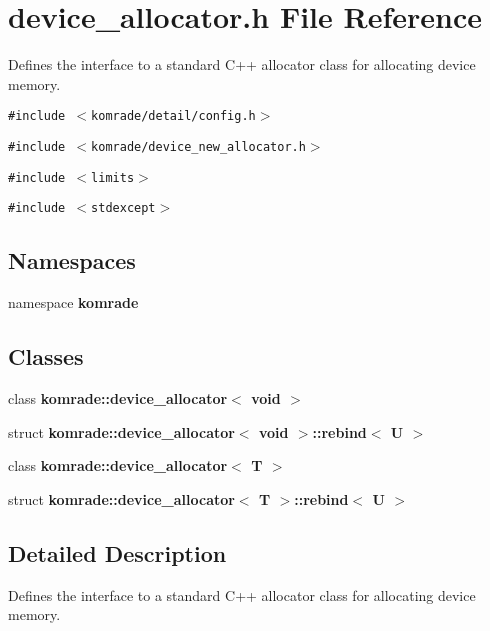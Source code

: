 \section{device\_\-allocator.h File Reference}
\label{device__allocator_8h}
Defines the interface to a standard C++ allocator class for allocating device memory. 

{\tt \#include $<$komrade/detail/config.h$>$}\par
{\tt \#include $<$komrade/device\_\-new\_\-allocator.h$>$}\par
{\tt \#include $<$limits$>$}\par
{\tt \#include $<$stdexcept$>$}\par
\subsection*{Namespaces}
\begin{CompactItemize}
\item 
namespace {\bf komrade}
\end{CompactItemize}
\subsection*{Classes}
\begin{CompactItemize}
\item 
class {\bf komrade::device\_\-allocator$<$ void $>$}
\item 
struct \textbf{komrade::device\_\-allocator$<$ void $>$::rebind$<$ U $>$}
\item 
class {\bf komrade::device\_\-allocator$<$ T $>$}
\item 
struct \textbf{komrade::device\_\-allocator$<$ T $>$::rebind$<$ U $>$}
\end{CompactItemize}


\subsection{Detailed Description}
Defines the interface to a standard C++ allocator class for allocating device memory. 


